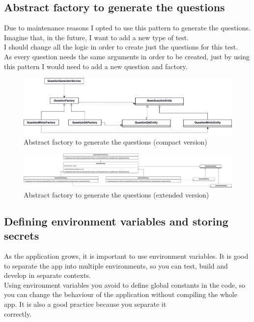         \subsection{Abstract factory to generate the questions}
            Due to maintenance reasons I opted to use this pattern to generate the questions. Imagine that, in the future, I want to add a new type of test. \\
            I should change all the logic in order to create just the questions for this test. \\
            As every question needs the same arguments in order to be created, just by using this pattern I would need to add a new question and factory. 
            \begin{figure}[H]
                \centering
                    \includegraphics[width=\textwidth]{assets/diagrams/abstractfactory1.png}
                \caption{Abstract factory to generate the questions (compact version)}
                \label{fig:implementation_af1}
            \end{figure}
            \newpage
            \begin{figure}[H]
                \centering
                    \includegraphics[angle=90, height=\textheight]{assets/diagrams/abstractfactory.png}
                \caption{Abstract factory to generate the questions (extended version)}
                \label{fig:implementation_af}
            \end{figure}

    \subsection{Defining environment variables and storing secrets}
        As the application grows, it is important to use environment variables. It is good to separate the app into multiple environments, so you can test, build and develop in separate contexts. \\
        Using environment variables you avoid to define global constants in the code, so you can change the behaviour of the application without compiling the whole app. It is also a good practice because you separate it \\
        correctly. \\
        
